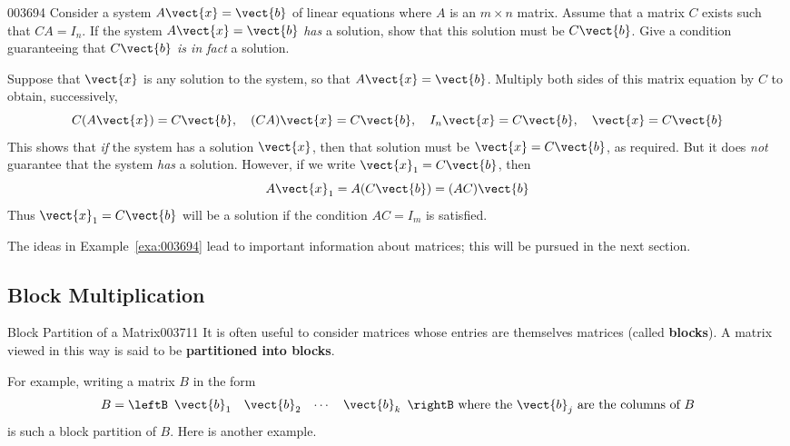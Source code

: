 \begin{example}{}{003694}
Consider a system $A\vect{x} = \vect{b}$ of linear equations where $A$ is an $m \times n$ matrix. Assume that a matrix $C$ exists such that $CA = I_{n}$. If the system $A\vect{x} = \vect{b}$ \textit{has} a solution, show that this solution must be $C\vect{b}$. Give a condition guaranteeing that $C\vect{b}$ \textit{is in fact} a solution.


\begin{solution}
  Suppose that $\vect{x}$ is any solution to the system, so that $A\vect{x} = \vect{b}$. Multiply both sides of this matrix equation by $C$ to obtain, successively,
\begin{equation*}
C(A\vect{x}) = C\vect{b}, \quad (CA)\vect{x} = C\vect{b}, \quad I_{n}\vect{x} = C\vect{b}, \quad \vect{x} = C\vect{b}
\end{equation*}
This shows that \textit{if} the system has a solution $\vect{x}$, then that solution must be $\vect{x} = C\vect{b}$, as required. But it does \textit{not} guarantee that the system \textit{has} a solution. However, if we write $\vect{x}_{1} = C\vect{b}$, then
\begin{equation*}
A\vect{x}_{1} = A(C\vect{b}) = (AC)\vect{b}
\end{equation*}
Thus $\vect{x}_{1} = C\vect{b}$ will be a solution if the condition $AC = I_{m}$ is satisfied.
\end{solution}
\end{example}

The ideas in Example~\ref{exa:003694} lead to important information about matrices; this will be pursued in the next section.



\subsection*{Block Multiplication}


\begin{definition}{Block Partition of a Matrix}{003711}
It is often useful to consider matrices whose entries are themselves matrices (called \textbf{blocks}). A matrix viewed in this way is said to be \textbf{partitioned into blocks}.
\end{definition}

\noindent For example, writing a matrix $B$ in the form
\begin{equation*}
B = \leftB \begin{array}{cccc}
\vect{b}_{1} & \vect{b}_{2} & \cdots & \vect{b}_{k}
\end{array} \rightB \mbox{ where the } \vect{b}_{j} \mbox{ are the columns of } B
\end{equation*}
is such a block partition of $B$. Here is another example.

